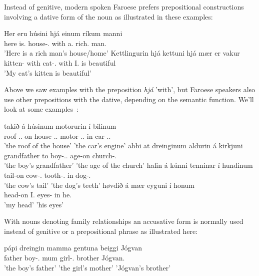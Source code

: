 \documentclass[12pt,%
    times,
]{lin-v2/lin}
\begin{document}
Instead of genitive, modern spoken Faroese prefers prepositional constructions involving a dative form of the noun as
illustrated in these examples:
\begin{exe}
    \ex
    \gll Her eru húsini hjá einum ríkum manni\\
    here is.\Pl{} house-\Det.\Pl{} with a.\Dat{} rich.\Dat{} man.\Dat{}\\
    'Here is a rich man'{}s house/home'
    \gll Kettlingurin hjá kettuni hjá mær er vakur\\
    kitten-\Det{} with cat-\Det{}.\Dat{} with I.\Dat{} is beautiful\\
    'My cat'{}s kitten is beautiful'
\end{exe}

Above we saw examples with the preposition \emph{hjá} 'with', but Faroese speakers also use other prepositions with the dative,
depending on the semantic function. We'll look at some examples~\citep{faroese}:
\begin{exe}
    \ex
    \gll takið á húsinum motorurin í bilinum\\
    roof-\Det{}.\Nom.\N{} on house-\Det{}.\Dat{}.\N{} motor-\Det{}.\Nom{}.\M{} in car-\Det.\Dat.\M\\
    \trans 'the roof of the house' 'the car'{}s engine'
    \gll abbi at dreinginum aldurin á kirkjuni\\
    grandfather to boy-\Det.\M.\Dat{} age-\Det on church-\Det.\Dat\\
    \trans 'the boy'{}s grandfather' 'the age of the church' 
    \gll halin á kúnni tenninar í hundinum\\
    tail-\Det on cow-\Det.\Dat{} tooth-\Det.\Pl{} in dog-\Det.\Dat\\
    \trans 'the cow'{}s tail' 'the dog'{}s teeth'
    \gll høvdið á mær eyguni í honum\\
    head-\Det on I.\Dat{} eyes-\Det{} in he.\Dat\\
    \trans 'my head' 'his eyes'
\end{exe}

With nouns denoting family relationships an accusative form is normally used instead of genitive or a prepositional phrase
as illustrated here:
\begin{exe}
    \ex
    \gll pápi dreingin mamma gentuna beiggi Jógvan\\
    father boy-\Det.\Acc{} mum girl-\Det.\Acc{} brother Jógvan.\Acc\\
    \trans 'the boy'{}s father' 'the girl'{}s mother' 'Jógvan'{}s brother'
\end{exe}
\end{document}
